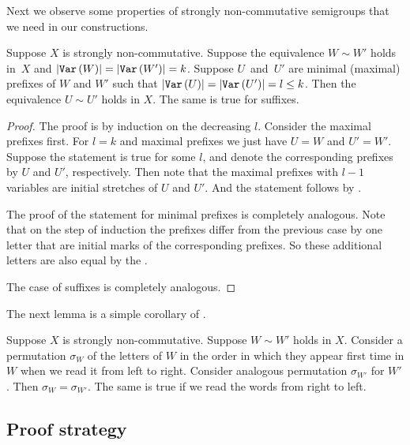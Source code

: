\documentclass{toc}
\begin{document}
Next we observe some properties of strongly non-commutative semigroups that we
need in our constructions.


\begin{lemma} \label{lem:prefix_equivalence}
Suppose $X$ is strongly non-commutative. Suppose the equivalence $W \sim W'$
holds in~$X$ and $|\texttt{Var}\,(W)|=|\texttt{Var}\,(W')|=k$. Suppose $U$~and~$U'$ are minimal
(maximal) prefixes of $W$ and $W'$ such that $|\texttt{Var}\,(U)| = |\texttt{Var}\,(U')| = l\leq k$.
Then the equivalence $U \sim U'$ holds in $X$. The same is true for suffixes.
\end{lemma}

\begin{proof}
The proof is by induction on the decreasing $l$. Consider the maximal prefixes
first. For $l=k$ and maximal prefixes we just have $U=W$ and $U'=W'$. Suppose
the statement is true for some $l$, and denote the corresponding prefixes by $U$
and $U'$, respectively. Then note that the maximal prefixes with $l-1$ variables
are 
initial stretches %
of $U$ and $U'$. And the statement follows by
.

The proof of the statement for minimal prefixes is completely analogous. Note
that on the step of induction the prefixes differ from the previous case by one
letter that are initial marks of the corresponding prefixes. So these additional
letters are also equal by the .

The case of suffixes is completely analogous.
\end{proof}

The next lemma is a simple corollary of .
\begin{lemma} \label{lem:variables_order}
Suppose $X$ is strongly non-commutative. Suppose $W \sim W'$ holds in $X$. Consider a permutation $\sigma_W$ of the letters of $W$ in the order in which they appear first time in $W$ when we read it from left to right. Consider analogous permutation $\sigma_{W'}$ for $W'$. Then $\sigma_W = \sigma_{W'}$.
%
The same is true if we read the words from right to left.

\end{lemma}

\subsection{Proof strategy}
\end{document}

